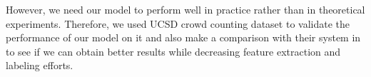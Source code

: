 However, we need our model to perform well in practice rather than in theoretical experiments. Therefore, we used UCSD crowd counting dataset \cite{chan2008privacy} to validate the performance of our model on it and also make a comparison with their system in \cite{chan2008privacy} to see if we can obtain better results while decreasing feature extraction and labeling efforts. 




